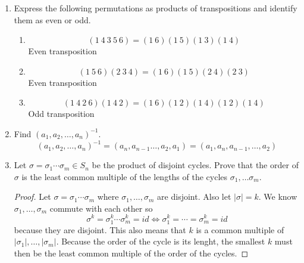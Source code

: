 \documentclass[12pt]{article}
\newcommand\setitemnumber[1]{\setcounter{enumi}{\numexpr#1-1\relax}}
\begin{document}
\begin{enumerate}[label=\textbf{\arabic*}.]
\begin{enumerate}
	      \end{enumerate}
	      \setitemnumber{3}
	\item Express the following permutations as products of transpositions and identify them as
	      even or odd.
	      \begin{enumerate}
		      \item \begin{equation*}
			            (1 \ 4 \ 3 \ 5 \ 6) = (1 \ 6)(1 \ 5)(1 \ 3)(1 \ 4)
		            \end{equation*}
		            Even transposition
		      \item \begin{equation*}
			            (1\ 5 \ 6)(2 \ 3 \ 4) = (1 \ 6)(1 \ 5)(2 \ 4)(2 \ 3)
		            \end{equation*}
		            Even transposition
		      \item \begin{equation*}
			            (1 \ 4 \ 2 \ 6)(1 \ 4 \ 2) = (1 \ 6)(1 \ 2)(1 \ 4)(1 \ 2)(1 \ 4)
		            \end{equation*}
		            Odd transposition
	      \end{enumerate}
          \setitemnumber{4}
          \item Find $(a_1, a_2, \dots, a_n)^{-1}$.
          \begin{equation*}
              (a_1, a_2, \dots, a_n)^{-1} = (a_n, a_{n-1} \dots, a_2, a_1) = (a_1, a_n, a_{n-1}, \dots, a_2)
          \end{equation*}
          \setitemnumber{13}
          \item Let $\sigma = \sigma_1 \cdots \sigma_m \in S_n$ be the product of disjoint cycles. Prove that the order of $\sigma$ is 
          the least common multiple of the lengths of the cycles $\sigma_1, \dots \sigma_m$.
          \begin{proof}
              Let $\sigma = \sigma_1 \cdots \sigma_m$ where $\sigma_1, \dots, \sigma_m$ are disjoint. Also let $|\sigma| = k$. 
              We know $\sigma_1,\dots, \sigma_m$ commute with each other so \begin{equation*}
                  \sigma^k = \sigma_1^k \cdots \sigma_m^k = id \Longleftrightarrow \sigma_1^k = \cdots = \sigma_m^k = id
              \end{equation*}
              because they are disjoint. This also means that $k$ is a common multiple of $|\sigma_1|, \dots, |\sigma_m|$. 
              Because the order of the cycle is its lenght, the smallest $k$ must then be the least common multiple 
              of the order of the cycles.
          \end{proof}
\end{enumerate}
\end{document}

